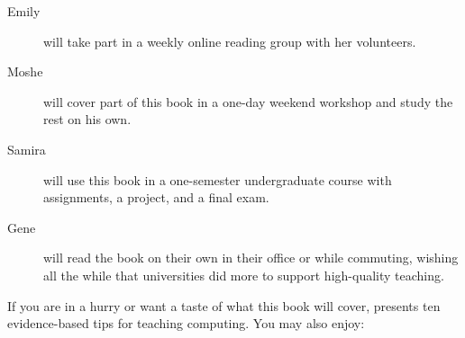 \begin{description}

\item[Emily]
  will take part in a weekly online reading group with her volunteers.

\item[Moshe]
  will cover part of this book in a one-day weekend workshop
  and study the rest on his own.

\item[Samira]
  will use this book in a one-semester undergraduate course with assignments, a project, and a final exam.

\item[Gene]
  will read the book on their own in their office or while commuting,
  wishing all the while that universities did more to support high-quality teaching.

\end{description}


If you are in a hurry or want a taste of what this book will cover,
\cite{Brow2018} presents ten evidence-based tips for teaching computing.
You may also enjoy:

